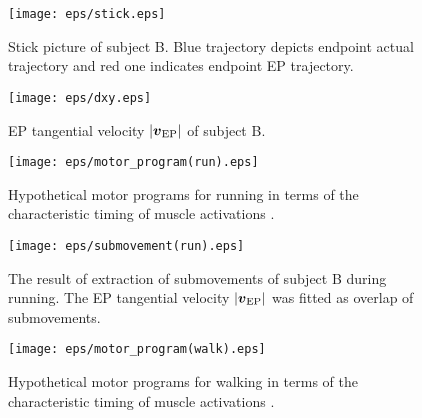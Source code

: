 %
\begin{figure}[!t]
 \begin{center}
  \texttt{[image: eps/stick.eps]}
  \caption{Stick picture of subject B. Blue trajectory depicts endpoint actual trajectory and red one indicates endpoint EP trajectory.}
  \label{stick}
 \end{center}
\end{figure}
%
\begin{figure}[!t]
 \begin{center}
  \texttt{[image: eps/dxy.eps]}
  \caption{EP tangential velocity $|\mbox{\boldmath $v$}_{\rm EP}|$ of subject B.}
  \label{dxy}
 \end{center}
\end{figure}
%
\begin{table}[!t]
 \caption{The number of extracted submovements.}
 \begin{center}
 \end{center}
\end{table}
%
\begin{figure}[!t]
 \begin{center}
  \texttt{[image: eps/motor\_program(run).eps]}
  \caption{Hypothetical motor programs for running in terms of the characteristic timing of muscle activations \cite{Cappellini2006}.}
  \label{motor_program(run)}
 \end{center}
\end{figure}
%
\begin{figure}[!t]
 \begin{center}
  \texttt{[image: eps/submovement(run).eps]}
  \caption{The result of extraction of submovements of subject B during running. The EP tangential velocity $|\mbox{\boldmath $v$}_{\rm EP}|$ was fitted as overlap of submovements.}
  \label{submovement(run)}
 \end{center}
\end{figure}
%
\begin{figure}[!t]
 \begin{center}
  \texttt{[image: eps/motor\_program(walk).eps]}
  \caption{Hypothetical motor programs for walking in terms of the characteristic timing of muscle activations \cite{Cappellini2006}.}
  \label{motor_program(walk)}
 \end{center}
\end{figure}
